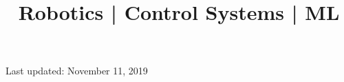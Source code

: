 \documentclass[10pt,a4paper]{moderncv}
\title{Robotics | Control Systems  | ML
	\newline
	\bf{\lb{\footnotesize
			Rerum Cognoscere Causas: To know the causes of things.} }}
\begin{document}
	\makecvtitle
	
	
	
	
	
	
	
	
	

	\footnotesize \centering Last updated: November 11, 2019
\clearpage
\end{document}
